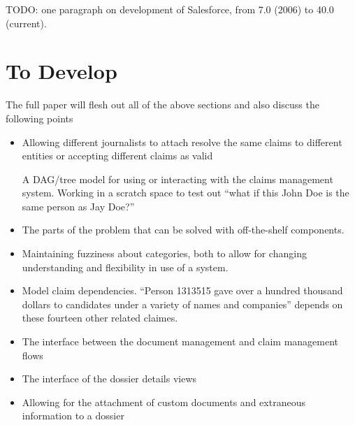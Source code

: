 \documentclass[format=siggraph, review=true]{acmart}
\begin{document}
TODO: one paragraph on development of Salesforce, from 7.0 (2006) to 40.0 (current). 


\section{To Develop}
The full paper will flesh out all of the above sections and also discuss
the following points

\begin{itemize}
  \item Allowing different journalists to attach resolve the same
    claims to different entities or accepting different claims as
    valid

    A DAG/tree model for using or interacting with the claims management system. Working in a scratch space to test out ``what if this John Doe is the same person as Jay Doe?''
  \item The parts of the problem that can be solved with off-the-shelf components.
  \item Maintaining fuzziness about categories, both to allow for changing understanding and flexibility in use of a system.
  \item Model claim dependencies. ``Person 1313515 gave over a hundred thousand dollars to candidates under a variety of names and companies'' depends on these fourteen other related claimes.
  \item The interface between the document management and claim
    management flows
  \item The interface of the dossier details views
  \item Allowing for the attachment of custom documents and extraneous
    information to a dossier
\end{itemize}
\end{document}

